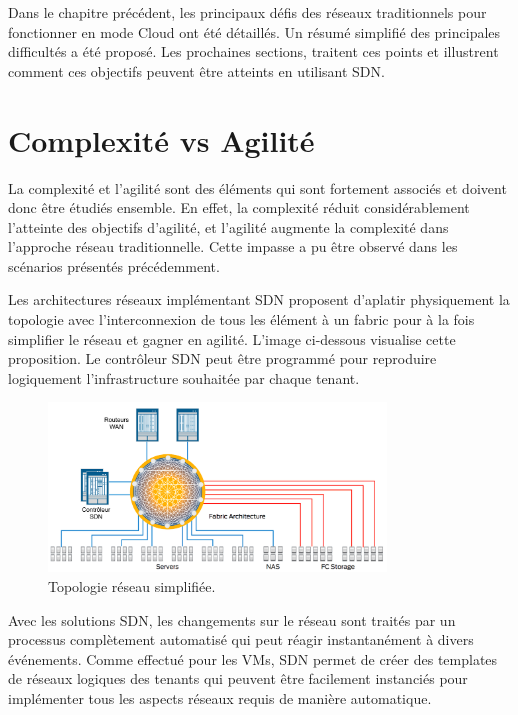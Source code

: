 Dans le chapitre précédent, les principaux défis des réseaux traditionnels pour fonctionner en mode Cloud ont été détaillés. Un résumé simplifié des principales difficultés a été proposé. Les prochaines sections, traitent ces points et illustrent comment ces objectifs peuvent être atteints en utilisant SDN.


\section{Complexité vs Agilité}

La complexité et l'agilité sont des éléments qui sont fortement associés et doivent donc être étudiés ensemble. En effet, la complexité réduit considérablement l'atteinte des objectifs d'agilité, et l'agilité augmente la complexité dans l'approche réseau traditionnelle. Cette impasse a pu être observé dans les scénarios présentés précédemment. 

Les architectures réseaux implémentant SDN proposent d'aplatir physiquement la topologie avec l'interconnexion de tous les élément à un \gls{fabric} pour à la fois simplifier le réseau et gagner en agilité. L'image ci-dessous visualise cette proposition. Le contrôleur SDN peut être programmé pour reproduire logiquement l'infrastructure souhaitée par chaque tenant. 

\begin{figure}[h]
\begin{center}
\includegraphics[width=0.8\textwidth]{images/RefArchiSDN} 
\caption{Topologie réseau simplifiée. \cite{cloudReadyNetworkJuniper}} \label{RefArchiSDN}
\end{center}
\end{figure} 

Avec les solutions SDN, les changements sur le réseau sont traités par un processus complètement automatisé qui peut réagir instantanément à divers événements. Comme effectué pour les VMs, SDN permet de créer des templates de réseaux logiques des tenants qui peuvent être facilement instanciés pour implémenter tous les aspects réseaux requis de manière automatique. 

